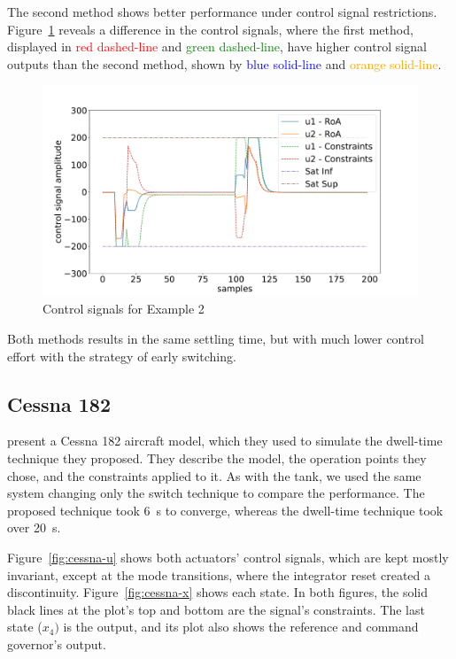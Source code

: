The second method shows better performance under control signal restrictions.
Figure~\ref{fig:unstable-control-signals} reveals a difference in the control
signals, where the first method, displayed in \textcolor{red}{red dashed-line}
and \textcolor{green}{green dashed-line}, have higher control signal outputs
than the second method, shown by \textcolor{blue}{blue solid-line} and
\textcolor{orange}{orange solid-line}.

\begin{figure}[ht!]
  \centering
  \captionsetup{justification=centering}
  \includegraphics[width=\linewidth]{imgs/unstable_control_signal}
  \caption{Control signals for Example 2}%
  \label{fig:unstable-control-signals}
\end{figure}

Both methods results in the same settling time, but with much lower control
effort with the strategy of early switching.

\FloatBarrier

\subsection{Cessna 182}%
\label{subsec:cessna}

\textcite{franzè.lucia.ea:command} present a Cessna 182 aircraft model, which
they used to simulate the dwell-time technique they proposed. They describe the
model, the operation points they chose, and the constraints applied to it. As
with the tank, we used the same system changing only the switch technique to
compare the performance. The proposed technique took \SI{6}{\second} to
converge, whereas the dwell-time technique took over \SI{20}{\second}.

Figure~\ref{fig:cessna-u} shows both actuators' control signals, which are kept
mostly invariant, except at the mode transitions, where the integrator reset
created a discontinuity. Figure~\ref{fig:cessna-x} shows each state. In both
figures, the solid black lines at the plot's top and bottom are the signal's
constraints. The last state (\(x_4)\) is the output, and its plot also shows the
reference and command governor's output.

